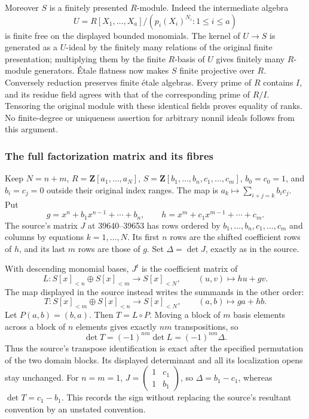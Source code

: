 Moreover \(S\) is a finitely presented \(R\)-module. Indeed the intermediate algebra \[
U=R[X_1,\ldots,X_a]/(p_i(X_i)^{N_i}:1\le i\le a)
\] is finite free on the displayed bounded monomials. The kernel of \(U\to S\) is generated as a \(U\)-ideal by the finitely many relations of the original finite presentation; multiplying them by the finite \(R\)-basis of \(U\) gives finitely many \(R\)-module generators. Étale flatness now makes \(S\) finite projective over \(R\). Conversely reduction preserves finite étale algebras. Every prime of \(R\) contains \(I\), and its residue field agrees with that of the corresponding prime of \(R/I\). Tensoring the original module with these identical fields proves equality of ranks. No finite-degree or uniqueness assertion for arbitrary nonnil ideals follows from this argument.

\subsubsection{The full factorization matrix and its fibres}\label{algebra-proof-051-the-full-factorization-matrix-and-its-fibres}

Keep \(N=n+m\), \(R=\mathbf Z[a_1,\ldots,a_N]\), \(S=\mathbf Z[b_1,\ldots,b_n,c_1,\ldots,c_m]\), \(b_0=c_0=1\), and \(b_i=c_j=0\) outside their original index ranges. The map is \(a_k\mapsto\sum_{i+j=k}b_ic_j\). Put \[
g=x^n+b_1x^{n-1}+\cdots+b_n,\qquad
h=x^m+c_1x^{m-1}+\cdots+c_m.
\] The source's matrix \(J\) at 39640--39653 has rows ordered by \(b_1,\ldots,b_n,c_1,\ldots,c_m\) and columns by equations \(k=1,\ldots,N\). Its first \(n\) rows are the shifted coefficient rows of \(h\), and its last \(m\) rows are those of \(g\). Set \(\Delta=\det J\), exactly as in the source.

With descending monomial bases, \(J^t\) is the coefficient matrix of \[
L:S[x]_{<n}\oplus S[x]_{<m}\longrightarrow S[x]_{<N},
\qquad (u,v)\longmapsto hu+gv.
\] The map displayed in the source instead writes the summands in the other order: \[
T:S[x]_{<m}\oplus S[x]_{<n}\longrightarrow S[x]_{<N},
\qquad(a,b)\longmapsto ga+hb.
\] Let \(P(a,b)=(b,a)\). Then \(T=L\circ P\). Moving a block of \(m\) basis elements across a block of \(n\) elements gives exactly \(nm\) transpositions, so \[
\det T=(-1)^{nm}\det L=(-1)^{nm}\Delta.
\] Thus the source's transpose identification is exact after the specified permutation of the two domain blocks. Its displayed determinant and all its localization opens stay unchanged. For \(n=m=1\), \(J=\left(\begin{smallmatrix}1&c_1\\1&b_1\end{smallmatrix}\right)\), so \(\Delta=b_1-c_1\), whereas \(\det T=c_1-b_1\). This records the sign without replacing the source's resultant convention by an unstated convention.


